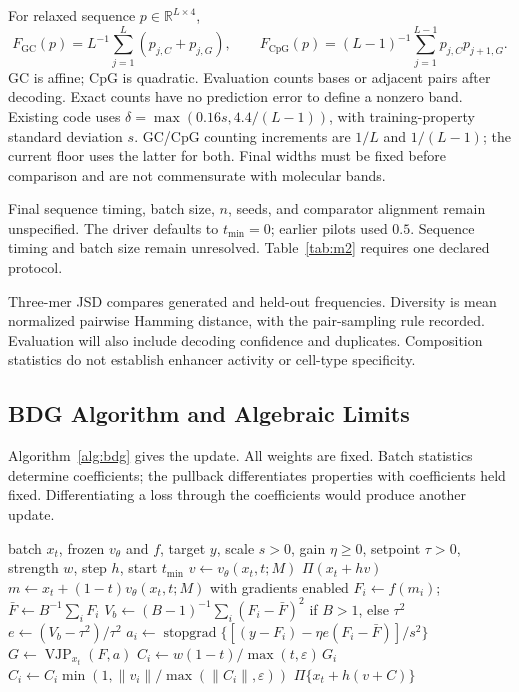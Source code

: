 \documentclass{article}
\newcommand{\Fbar}{\bar F}
\newcommand{\Vb}{V_b}
\newcommand{\sg}{\operatorname{stopgrad}}
\begin{document}
For relaxed sequence $p\in\mathbb R^{L\times4}$,
\[
F_{\mathrm{GC}}(p)=L^{-1}\sum_{j=1}^L(p_{j,C}+p_{j,G}),\qquad
F_{\mathrm{CpG}}(p)=(L-1)^{-1}\sum_{j=1}^{L-1}p_{j,C}p_{j+1,G}.
\]
GC is affine; CpG is quadratic. Evaluation counts bases or adjacent pairs after decoding. Exact counts have no prediction error to define a nonzero band. Existing code uses $\delta=\max(0.16s,4.4/(L-1))$, with training-property standard deviation $s$. GC/CpG counting increments are $1/L$ and $1/(L-1)$; the current floor uses the latter for both. Final widths must be fixed before comparison and are not commensurate with molecular bands.

Final sequence timing, batch size, $n$, seeds, and comparator alignment remain unspecified. The driver defaults to $t_{\min}=0$; earlier pilots used $0.5$. Sequence timing and batch size remain unresolved. Table~\ref{tab:m2} requires one declared protocol.

Three-mer JSD compares generated and held-out frequencies. Diversity is mean normalized pairwise Hamming distance, with the pair-sampling rule recorded. Evaluation will also include decoding confidence and duplicates. Composition statistics do not establish enhancer activity or cell-type specificity.

\subsection{BDG Algorithm and Algebraic Limits}\label{app:algebra}
Algorithm~\ref{alg:bdg} gives the update. All weights are fixed. Batch statistics determine coefficients; the pullback differentiates properties with coefficients held fixed. Differentiating a loss through the coefficients would produce another update.

\begin{algorithm}[htbp]
\caption{One BDG-guided Euler step}\label{alg:bdg}
\begin{algorithmic}[1]
\Require batch $x_t$, frozen $v_\theta$ and $f$, target $y$, scale $s>0$, gain $\eta\ge0$, setpoint $\tau>0$, strength $w$, step $h$, start $t_{\min}$
\State $v\gets v_\theta(x_t,t;M)$
 \State \Return $\Pi(x_t+h v)$ \EndIf
\State $m\gets x_t+(1-t)v_\theta(x_t,t;M)$ with gradients enabled
\State $F_i\gets f(m_i)$; $\Fbar\gets B^{-1}\sum_iF_i$
\State $\Vb\gets (B-1)^{-1}\sum_i(F_i-\Fbar)^2$ if $B>1$, else $\tau^2$
\State $e\gets(\Vb-\tau^2)/\tau^2$ 
\State $a_i\gets\sg\{[(y-F_i)-\eta e(F_i-\Fbar)]/s^2\}$
\State $G\gets\operatorname{VJP}_{x_t}(F,a)$
\State $C_i\gets w(1-t)/\max(t,\varepsilon)\,G_i$
\State $C_i\gets C_i\min(1,\|v_i\|/\max(\|C_i\|,\varepsilon))$
\State \Return $\Pi\{x_t+h(v+C)\}$
\end{algorithmic}
\end{algorithm}
\end{document}
